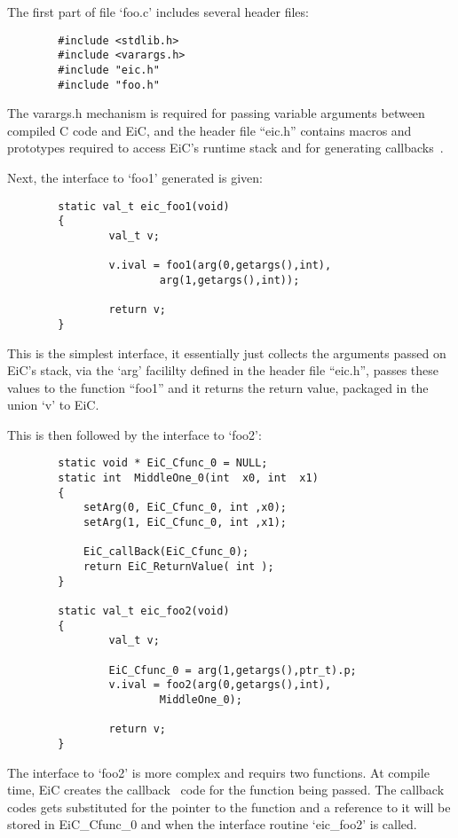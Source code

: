 The first part of file `foo.c' includes several header files:

\small
\begin{verbatim}
        #include <stdlib.h>
        #include <varargs.h>
        #include "eic.h"
        #include "foo.h"
\end{verbatim}
\normalsize

The varargs.h mechanism is required for passing variable arguments
between compiled C code and EiC, and the header file ``eic.h'' contains
macros and prototypes required to access EiC's runtime stack and
for generating callbacks~.

Next, the interface to `foo1' generated is given:

\small
\begin{verbatim}
        static val_t eic_foo1(void)
        {
                val_t v;
        
                v.ival = foo1(arg(0,getargs(),int),
                        arg(1,getargs(),int));
        
                return v;
        }
\end{verbatim}
\normalsize

This is the simplest interface, it essentially just collects the
arguments passed on EiC's stack, via the `arg' facililty defined in the
header file ``eic.h'', passes these values to the function ``foo1''
and it returns the return value, packaged in the union `v'
to EiC.

This is then followed by the interface to `foo2':

\small
\begin{verbatim}
        static void * EiC_Cfunc_0 = NULL;
        static int  MiddleOne_0(int  x0, int  x1)
        {
            setArg(0, EiC_Cfunc_0, int ,x0);
            setArg(1, EiC_Cfunc_0, int ,x1);
        
            EiC_callBack(EiC_Cfunc_0);
            return EiC_ReturnValue( int );
        }
        
        static val_t eic_foo2(void)
        {
                val_t v;
        
                EiC_Cfunc_0 = arg(1,getargs(),ptr_t).p;
                v.ival = foo2(arg(0,getargs(),int),
                        MiddleOne_0);
        
                return v;
        }
\end{verbatim}
\normalsize

The interface to `foo2' is more complex and requirs two functions.  At
compile time, EiC creates the callback~ code for the function being
passed. The callback codes gets substituted for the pointer to the
function and a reference to it will be stored in EiC\_Cfunc\_0 and when
the interface routine `eic\_foo2' is called.

